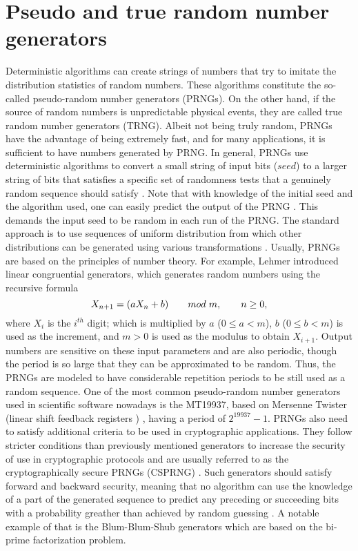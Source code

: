 \documentclass[]{interact}
\theoremstyle{plain}%
\theoremstyle{definition}
\theoremstyle{remark}
\begin{document}
\section{Pseudo and true random number generators\label{sec:pseudo&true}}
Deterministic algorithms can create strings of numbers that try to imitate the distribution statistics of random numbers. These algorithms constitute the so-called pseudo-random number generators (PRNGs). On the other hand, if the source of random numbers is unpredictable physical events, they are called true random number generators (TRNG). Albeit not being truly random, PRNGs have the advantage of being extremely fast, and for many applications, it is sufficient to have numbers generated by PRNG. In general, PRNGs use deterministic algorithms to convert a small string of input bits ($seed$)  to a larger string of bits that satisfies a specific set of randomness tests that a genuinely random sequence should satisfy \cite{l2012random}. Note that with knowledge of the initial seed and the algorithm used, one can easily predict the output of the PRNG \cite{pub2001140,barker2012recommendation}. This demands the input seed to be random in each run of the PRNG. The standard approach is to use sequences of uniform distribution from which other distributions can be generated using various transformations \cite{hormann2004automatic,knuth1997art}. Usually, PRNGs are based on the principles of number theory. For example, Lehmer introduced \cite{lehmer1951mathematical} linear congruential generators, which generates random numbers using the recursive formula
$$
    X_{n+1}=(aX_n+b) \hspace{2em}mod\hspace{0.3em} m, \hspace{2em}n\geq 0,
$$
where $X_i$ is the $i^{th}$ digit; which is multiplied by $a$ ($0\leq a<m$),  $b$ ($0\leq b<m$) is used as the increment, and $m>0$ is used as the modulus to obtain $X_{i+1}$.  Output numbers are sensitive on these input parameters and are also periodic, though the period is so large that they can be approximated to be random. Thus, the PRNGs are modeled to have considerable repetition periods to be still used as a random sequence. One of the most common pseudo-random number generators used in scientific software nowadays is the MT19937, based on Mersenne Twister (linear shift feedback registers \cite{klein2013linear}) \cite{matsumoto1998mersenne}, having a period of $2^{19937}-1$.
PRNGs also need to satisfy additional criteria to be used in cryptographic applications. They follow stricter conditions  than previously mentioned generators to increase the security of use in cryptographic protocols and are usually referred to as the cryptographically secure PRNGs (CSPRNG) \cite{herrero2017quantum}. Such generators should satisfy forward and backward security, meaning that no algorithm can use the knowledge of a part of the generated sequence to predict any preceding or succeeding bits with a probability greather than achieved by random guessing \cite{yao1982theory,10.1145/3335741.3335751}. A notable example of that is the Blum-Blum-Shub generators \cite{doi:10.1137/0215025} which are based on the bi-prime factorization problem. 
\end{document}
